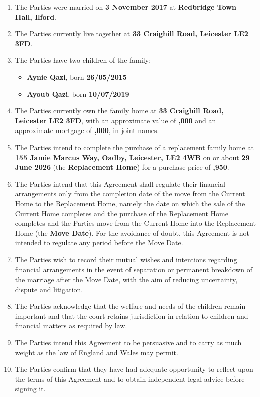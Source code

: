 \documentclass[10pt,a4paper]{article}
\newcommand{\CurrentHome}{33 Craighill Road, Leicester LE2 3FD}
\newcommand{\ReplacementHome}{155 Jamie Marcus Way, Oadby, Leicester, LE2 4WB}
\newcommand{\MarriageDate}{3 November 2017}
\newcommand{\MarriagePlace}{Redbridge Town Hall, Ilford}
\begin{document}
\begin{enumerate}[label=\arabic*., leftmargin=1.8em]
    \item The Parties were married on \textbf{\MarriageDate} at \textbf{\MarriagePlace}.
    \item The Parties currently live together at \textbf{\CurrentHome}.
    \item The Parties have two children of the family:
    \begin{itemize}[leftmargin=1.8em]
        \item \textbf{Aynie Qazi}, born \textbf{26/05/2015}
        \item \textbf{Ayoub Qazi}, born \textbf{10/07/2019}
    \end{itemize}
    \item The Parties currently own the family home at \textbf{\CurrentHome}, with an approximate value of \textbf{,000} and an approximate mortgage of \textbf{,000}, in joint names.
    \item The Parties intend to complete the purchase of a replacement family home at \textbf{\ReplacementHome} on or about \textbf{29 June 2026} (the \textbf{Replacement Home}) for a purchase price of \textbf{,950}.
    \item The Parties intend that this Agreement shall regulate their financial arrangements only from the completion date of the move from the Current Home to the Replacement Home, namely the date on which the sale of the Current Home completes and the purchase of the Replacement Home completes and the Parties move from the Current Home into the Replacement Home (the \textbf{Move Date}). For the avoidance of doubt, this Agreement is not intended to regulate any period before the Move Date.
    \item The Parties wish to record their mutual wishes and intentions regarding financial arrangements in the event of separation or permanent breakdown of the marriage after the Move Date, with the aim of reducing uncertainty, dispute and litigation.
    \item The Parties acknowledge that the welfare and needs of the children remain important and that the court retains jurisdiction in relation to children and financial matters as required by law.
    \item The Parties intend this Agreement to be persuasive and to carry as much weight as the law of England and Wales may permit.
    \item The Parties confirm that they have had adequate opportunity to reflect upon the terms of this Agreement and to obtain independent legal advice before signing it.
\end{enumerate}
\end{document}
